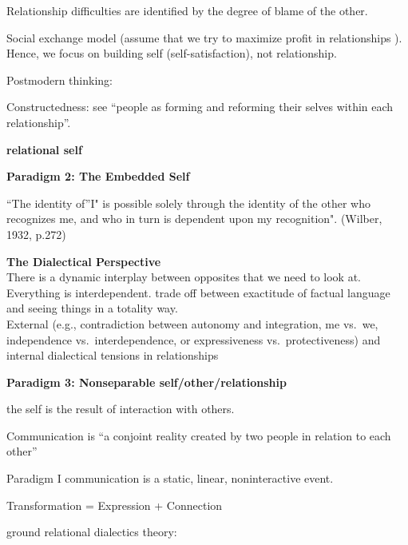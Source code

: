 \documentclass[
]{book}
\begin{document}
Relationship difficulties are identified by the degree of blame of the other.

Social exchange model (assume that we try to maximize profit in relationships ). Hence, we focus on building self (self-satisfaction), not relationship.

Postmodern thinking:

Constructedness: see ``people as forming and reforming their selves within each relationship''.

\textbf{relational self}

\textbf{Paradigm 2: The Embedded Self}

``The identity of''I" is possible solely through the identity of the other who recognizes me, and who in turn is dependent upon my recognition". (Wilber, 1932, p.272)

\textbf{The Dialectical Perspective}\\
There is a dynamic interplay between opposites that we need to look at. Everything is interdependent. trade off between exactitude of factual language and seeing things in a totality way.\\
External (e.g., contradiction between autonomy and integration, me vs.~we, independence vs.~interdependence, or expressiveness vs.~protectiveness) and internal dialectical tensions in relationships

\textbf{Paradigm 3: Nonseparable self/other/relationship}

the self is the result of interaction with others.

Communication is ``a conjoint reality created by two people in relation to each other''

Paradigm I \textbar{} communication is a static, linear, noninteractive event.

Transformation = Expression + Connection

\citep{Baxter_2004}

ground relational dialectics theory:
\end{document}
